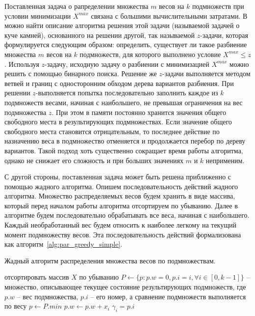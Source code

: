 Поставленная задача о рапределении множества $m$ весов на $k$ подмножеств при условии минимизации $X^{max}$ связана с большими вычислительными затратами.
В \cite{Romanovskii1977Extreme} можно найти описание алгоритма решения этой задачи (называемой задачей о куче камней), основанного на решении другой, так называемой $z$-задачи, которая формулируется следующим образом: определить, существует ли такое разбиение множества $m$ весов на $k$ подмножеств, для которого выполнено условие $X^{max} \le z$.
Используя $z$-задачу, исходную задачу о разбиении с минимизацией $X^{max}$ можно решить с помощью бинарного поиска.
Решение же $z$-задачи выполняется методом ветвей и границ с односторонним обходом дерева вариантов разбиения.
При решении $z$-выполняется попытка последовательно заполнить каждое из $k$ подмножеств весами, начиная с наибольшего, не превышая ограничения на вес подмножества $z$.
При этом в памяти постоянно хранится значения общего свободного места в результирующих подмножествах.
Если значение общего свободного места становится отрицательным, то последнее действие по назначению веса в подмножество отменяется и продолжается перебор по дереву вариантов.
Такой подход хоть существенно сокращает время работы алгоритма, однако не снижает его сложность и при больших значениях $m$ и $k$ неприменим.

С другой стороны, поставленная задача может быть решена приближенно с помощью жадного алгоритма.
Опишем последовательность действий жадного алгоритма.
Множество распределяемых весов будем хранить в виде массива, который перед началом работы алгоритма отсортируем по убыванию.
Далее в алгоритме будем последовательно обрабатывать все веса, начиная с наибольшего.
Каждый необработанный вес будем относить к наиболее легкому на текущий момент подмножеству весов.
Эта последовательность действий формализована как алгоритм~\ref{alg:par_greedy_simple}.

\begin{algo}\label{alg:par_greedy_simple}
Жадный алгоритм распределения множества весов по подмножествам.
\begin{algorithm}
\DontPrintSemicolon
{}
отсортировать массив $X$ по убыванию\;
$P \leftarrow \{ p : p.w = 0, p.i = i, \forall i \in [0, k - 1] \}$ -- множество, описывающее текущее состояние результирующих подмножеств, где $p.w$ -- вес подмножества, $p.i$ -- его номер, а сравнение подмножеств выполняется по весу\;
{
	$p \leftarrow P.min$\;
	$p.w \leftarrow p.w + x_i$\;	
	$\gamma_i = p.i$\;
}
\end{algorithm}
\end{algo}

